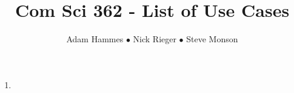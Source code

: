 \documentclass[11pt]{article}
\title{Com Sci 362 - List of Use Cases}
\author{Adam Hammes $\bullet$ Nick Rieger $\bullet$ Steve Monson}
\begin{document}
\maketitle

\begin{enumerate}[(1)]
\item 
\end{enumerate}
\end{document}
